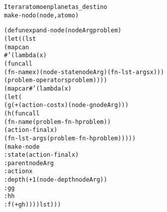 \begin{aibox}{\pseudocode}
\begin{alltt}
Iterar atomo en planetas\_destino
    make-nodo (node,atomo)

\end{alltt}
\end{aibox}

\begin{aibox}{\code}
\begin{alltt}
(defun expand-node (nodeArg problem)
    (let ((lst
            (mapcan
                \#'(lambda(x)  
                    (funcall 
                        (fn-name x) (node-state nodeArg) (fn-lst-args x))) 
                (problem-operators problem))))
            (mapcar \#'(lambda(x) 
                (let (
                    (g (+ (action-cost x) (node-g nodeArg)))
                    (h (funcall 
                            (fn-name (problem-fn-h problem)) 
                            (action-final x) 
                            ( fn-lst-args (problem-fn-h problem)))))
                        (make-node
                            :state (action-final x)
                            :parent nodeArg
                            :action x
                            :depth (+ 1 (node-depth nodeArg))
                            :g g
                            :h h
                            :f (+ g h)))) lst)))





\end{alltt}
\end{aibox}
